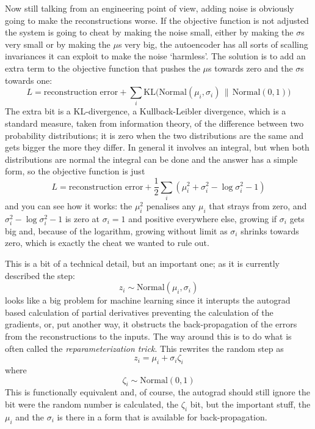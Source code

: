 \documentclass[12pt]{article}
\begin{document}
Now still talking from an engineering point of view, adding noise is
obviously going to make the reconstructions worse. If the objective
function is not adjusted the system is going to cheat by making the
noise small, either by making the $\sigma$s very small or by making
the $\mu$s very big, the autoencoder has all sorts of scalling
invariances it can exploit to make the noise `harmless'. The solution
is to add an extra term to the objective function that pushes the $\mu$s towards zero and the $\sigma$s towards one:
\begin{equation}
L=\text{reconstruction error}+\sum_i\mathrm{KL}\big(\text{Normal}(\mu_i,\sigma_i)\,\|\,\text{Normal}(0,1)\big)
\end{equation}
The extra bit is a KL-divergence, a Kullback-Leibler divergence, which
is a standard measure, taken from information theory, of the
difference between two probability distributions; it is zero when the
two distributions are the same and gets bigger the more they differ.
In general it involves an integral, but when both distributions are
normal the integral can be done and the answer has a simple form, so
the objective function is just
\begin{equation}
L=\text{reconstruction error}+\frac{1}{2}\sum_i\left(\mu_i^2+\sigma_i^2-\log{\sigma_i^2}-1\right)
\end{equation}
and you can see how it works: the $\mu_i^2$ penalises any $\mu_i$ that
strays from zero, and $\sigma_i^2-\log{\sigma_i^2}-1$ is zero at
$\sigma_i=1$ and positive everywhere else, growing if $\sigma_i$ gets
big and, because of the logarithm, growing without limit as $\sigma_i$
shrinks towards zero, which is exactly the cheat we wanted to rule out.

This is a bit of a technical detail, but an important one; as it is currently described the step:
\begin{equation}
  z_i\sim\text{Normal}(\mu_i,\sigma_i)
\end{equation}
looks like a big problem for machine learning since it interupts the
autograd based calculation of partial derivatives preventing the
calculation of the gradients, or, put another way, it obstructs the
back-propagation of the errors from the reconstructions to the inputs. The way around this is to do what is often called the \textsl{reparameterization trick}. This rewrites the random step as
\begin{equation}
  z_i=\mu_i+\sigma_i \zeta_i
\end{equation}
where
\begin{equation}
  \zeta_i\sim\text{Normal}(0,1)
\end{equation}
This is functionally equivalent and, of course, the autograd should
still ignore the bit were the random number is calculated, the
$\zeta_i$ bit, but the important stuff, the $\mu_i$ and the $\sigma_i$
is there in a form that is available for back-propagation.
\end{document}
